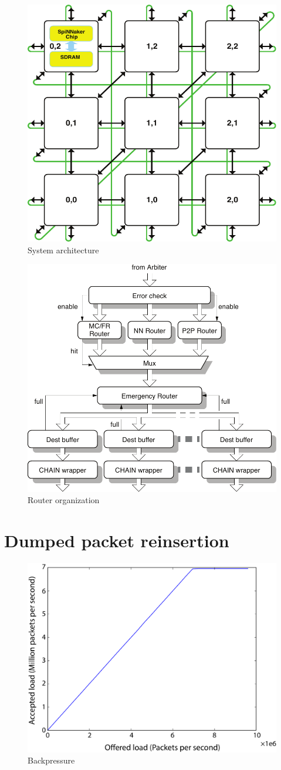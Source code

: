 \documentclass[a4paper, 11pt]{article}
\begin{document}
\begin{figure}[htbp]
	\centering
	\includegraphics[width=0.4\linewidth]{images/system_architecture.pdf}
	\caption{System architecture}	
\end{figure}

\begin{figure}[htbp]
	\centering
	\includegraphics[width=0.6\linewidth]{images/router_organization.pdf}
	\caption{Router organization}	
\end{figure}

\clearpage
\section{Dumped packet reinsertion}
\begin{figure}[htbp]
	\centering
	\includegraphics[width=0.6\linewidth]{images/backpressure.pdf}
	\caption{Backpressure}	
\end{figure}
\end{document}
